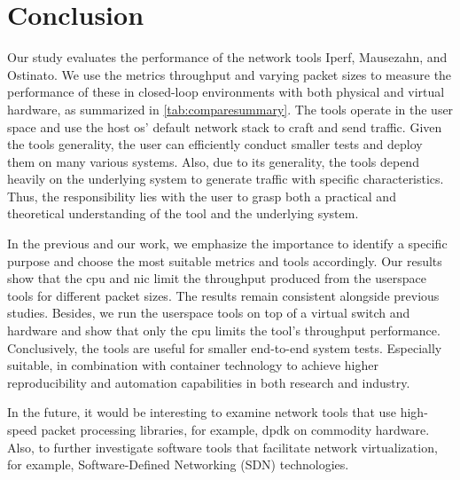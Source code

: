 \chapter{Conclusion}\label{conclusion}

Our study evaluates the performance of the network tools Iperf, Mausezahn, and Ostinato.
We use the metrics throughput and varying packet sizes to measure the performance of these in closed-loop environments with both physical and virtual hardware, as summarized in \cref{tab:comparesummary}.
The tools operate in the user space and use the host \acrshort{os}' default network stack to craft and send traffic.
Given the tools generality, the user can efficiently conduct smaller tests and deploy them on many various systems.
Also, due to its generality, the tools depend heavily on the underlying system to generate traffic with specific characteristics.
Thus, the responsibility lies with the user to grasp both a practical and theoretical understanding of the tool and the underlying system.

\skippara In the previous and our work, we emphasize the importance to identify a specific purpose and choose the most suitable metrics and tools accordingly.
Our results show that the \acrshort{cpu} and \acrshort{nic} limit the throughput produced from the userspace tools for different packet sizes.
The results remain consistent alongside previous studies.
Besides, we run the userspace tools on top of a virtual switch and hardware and show that only the \acrshort{cpu} limits the tool's throughput performance.
Conclusively, the tools are useful for smaller end-to-end system tests.
Especially suitable, in combination with container technology to achieve higher reproducibility and automation capabilities in both research and industry.

\skippara In the future, it would be interesting to examine network tools that use high-speed packet processing libraries, for example, \acrfull{dpdk} on commodity hardware.
Also, to further investigate software tools that facilitate network virtualization, for example, Software-Defined Networking (SDN) technologies.
